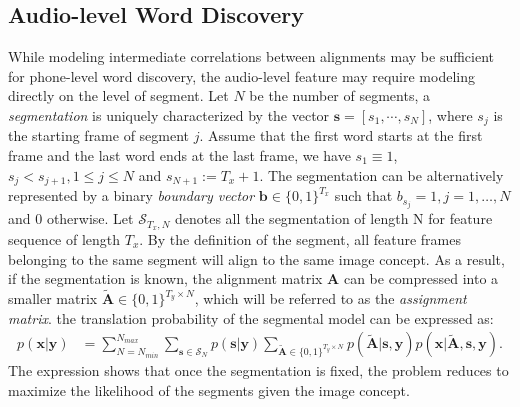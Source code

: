 \documentclass[journal]{IEEEtran}
\begin{document}
\subsection{Audio-level Word Discovery}
While modeling intermediate correlations between alignments may be sufficient for phone-level word discovery, the audio-level feature may require modeling directly on the level of segment. Let $N$ be the number of segments, a \textit{segmentation} is uniquely characterized by the vector $\mathbf s = [s_1, \cdots, s_N]$, where $s_j$ is the starting frame of segment $j$. Assume that the first word starts at the first frame and the last word ends at the last frame, we have $s_1 \equiv 1$, $s_j < s_{j+1}, 1\leq j \leq N$ and $s_{N+1} := T_x+1$. The segmentation can be alternatively represented by a binary \textit{boundary vector} $\mathbf b \in \{0, 1\}^{T_x}$ such that $b_{s_j}=1, j=1,\ldots,N$ and 0 otherwise. Let $\mathcal S_{T_x, N}$ denotes all the segmentation of length N for feature sequence of length $T_x$. By the definition of the segment, all feature frames belonging to the same segment will align to the same image concept. As a result, if the segmentation is known, the alignment matrix $\mathbf A$ can be compressed into a smaller matrix $\tilde{\mathbf{A}} \in \{0, 1\}^{T_y \times N}$, which will be referred to as the \textit{assignment matrix}. the translation probability of the segmental model can be expressed as:
\begin{align}\label{eq:trans_prob_segmental}
    p(\mathbf x|\mathbf y) &= \sum_{N=N_{min}}^{N_{max}} \sum_{\mathbf s \in \mathcal S_N} p(\mathbf s|\mathbf y)\sum_{\tilde{\mathbf{A}} \in \{0, 1\}^{T_y \times N}} p(\tilde{\mathbf{A}}| \mathbf s, \mathbf y) p(\mathbf x|\tilde{\mathbf A}, \mathbf s, \mathbf y).
\end{align}
The expression shows that once the segmentation is fixed, the problem reduces to maximize the likelihood of the segments given the image concept.
\end{document}
